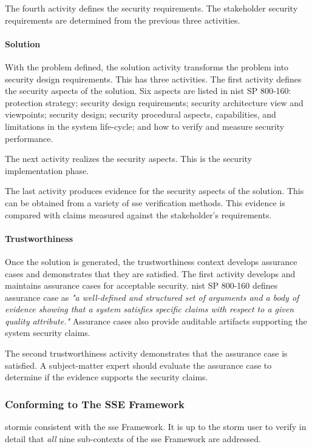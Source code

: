 \documentclass[../../main/main.tex]{subfiles}
\begin{document}
The fourth activity defines the security requirements.  The stakeholder security requirements are determined from the previous three activities.

\paragraph*{Solution}
With the problem defined, the solution activity transforms the problem into security design requirements.  This has three activities.  The first activity defines the security aspects of the solution. Six aspects are listed in \gls{nist} SP 800-160: protection strategy; security design requirements; security architecture view and viewpoints; security design; security procedural aspects, capabilities, and limitations in the system life-cycle; and how to verify and measure security performance. 

The next activity realizes the security aspects.  This is the security implementation phase.

The last activity produces evidence for the security aspects of the solution. This can be obtained from a variety of \gls{sse} verification methods.  This evidence is compared with claims measured against the stakeholder's requirements.

\paragraph*{Trustworthiness}
Once the solution is generated, the trustworthiness context develops assurance cases and demonstrates that they are satisfied.  The first activity develops and maintains assurance cases for acceptable security.  \gls{nist} SP 800-160 defines assurance case as \textit{"a well-defined and structured set of arguments and a body of evidence showing that a system satisfies specific claims with respect to a given quality attribute."}  Assurance cases also provide auditable artifacts supporting the system security claims.

The second trustworthiness activity demonstrates that the assurance case is satisfied.  A subject-matter expert should evaluate the assurance case to determine if the evidence supports the security claims.

\subsubsection{Conforming to The SSE Framework}
\gls{storm}is consistent with the \gls{sse} Framework.  It is up to the \gls{storm} user to verify in detail that \textit{all} nine sub-contexts of the \gls{sse} Framework are addressed.  
\end{document}
